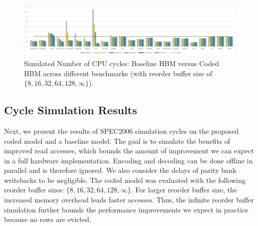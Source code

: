 \begin{figure}[htb] \centering
\includegraphics[width=0.97\linewidth]{figures/spec-cycles-all.pdf} 
\caption{Simulated Number of CPU cycles: Baseline HBM versus Coded HBM across different benchmarks (with reorder buffer size of $\{8,16,32,64,128,\infty\}$). }
\label{fig:spec-cycles}
\end{figure}

\subsection{Cycle Simulation Results}
\label{sec:results}


Next, we present the results of SPEC2006 simulation cycles on the proposed coded model and a baseline model. The goal is to simulate the benefits of improved read accesses, which bounds the amount of improvement we can expect in a full hardware implementation. Encoding and decoding can be done offline in parallel and is therefore ignored. We also consider the delays of parity bank writebacks to be negligible. The coded model was evaluated with the following reorder buffer sizes: $\{8,16,32,64,128,\infty\}$.  
For larger reorder buffer size, the increased memory overhead leads faster accesses.
Thus, the infinite reorder buffer simulation further bounds the performance improvements we expect in practice because no rows are evicted. 

